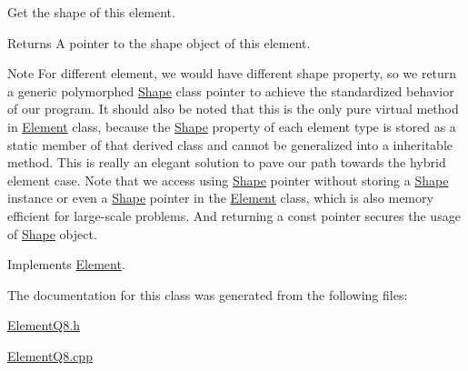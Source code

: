Get the shape of this element. 

\begin{DoxyReturn}{Returns}
A pointer to the shape object of this element.
\end{DoxyReturn}
\begin{DoxyNote}{Note}
For different element, we would have different shape property, so we return a generic polymorphed \mbox{\hyperlink{class_shape}{Shape}} class pointer to achieve the standardized behavior of our program. It should also be noted that this is the only pure virtual method in \mbox{\hyperlink{class_element}{Element}} class, because the \mbox{\hyperlink{class_shape}{Shape}} property of each element type is stored as a static member of that derived class and cannot be generalized into a inheritable method. This is really an elegant solution to pave our path towards the hybrid element case. Note that we access using \mbox{\hyperlink{class_shape}{Shape}} pointer without storing a \mbox{\hyperlink{class_shape}{Shape}} instance or even a \mbox{\hyperlink{class_shape}{Shape}} pointer in the \mbox{\hyperlink{class_element}{Element}} class, which is also memory efficient for large-\/scale problems. And returning a const pointer secures the usage of \mbox{\hyperlink{class_shape}{Shape}} object. 
\end{DoxyNote}


Implements \mbox{\hyperlink{class_element_aadc36f89fa5f11da7e74d6528ecdcacc}{Element}}.



The documentation for this class was generated from the following files\+:\begin{DoxyCompactItemize}
\item 
\mbox{\hyperlink{_element_q8_8h}{Element\+Q8.\+h}}\item 
\mbox{\hyperlink{_element_q8_8cpp}{Element\+Q8.\+cpp}}\end{DoxyCompactItemize}
